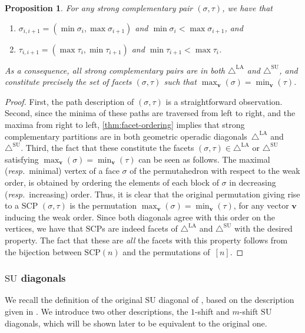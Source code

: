 \documentclass{amsart}
\newtheorem{proposition}[theorem]{Proposition}
\theoremstyle{definition}
\renewcommand{\b}[1]{{\boldsymbol{#1}}} %
\newcommand{\resp}{\textit{resp.}~} %
\renewcommand{\b}[1]{\boldsymbol{#1}} %
\newcommand{\SU}{\mathrm{SU}}
\newcommand{\SUD}{\triangle^{\mathrm{SU}}}
\newcommand{\LAD}{\triangle^{\mathrm{LA}}}
\newcommand{\SCP}{\mathrm{SCP}}
\begin{document}
\begin{proposition} 
\label{lem:SCP-path-desc}
For any strong complementary pair $(\sigma,\tau)$, we have that
\begin{enumerate}
	\item $ \sigma_{i,i+1} = ( \min \sigma_i, \max \sigma_{i+1} )$ and $\min \sigma_i< \max \sigma_{i+1}$, and
	\item $  \tau_{i,i+1} =  ( \max \tau_i, \min \tau_{i+1} )$ and $\min \tau_{i+1}< \max \tau_{i}$.
\end{enumerate}
As a consequence, all strong complementary pairs are in both $\LAD$ and $\SUD$, and constitute precisely the set of facets $(\sigma,\tau)$ such that $\max_{\b{v}}(\sigma) = \min_{\b{v}}(\tau)$.
\end{proposition}
\begin{proof}
First, the path description of $(\sigma,\tau)$ is a straightforward observation. 
Second, since the minima of these paths are traversed from left to right, and the maxima from right to left, \cref{thm:facet-ordering} implies that strong complementary partitions are in both geometric operadic diagonals~$\LAD$ and~$\SUD$.
Third, the fact that these constitute the facets $(\sigma,\tau) \in \LAD$ or $\SUD$ satisfying $\max_{\b{v}}(\sigma) = \min_{\b{v}}(\tau)$ can be seen as follows.
The maximal (\resp minimal) vertex of a face $\sigma$ of the permutahedron with respect to the weak order, is obtained by ordering the elements of each block of $\sigma$ in decreasing (\resp increasing) order. 
Thus, it is clear that the original permutation giving rise to a $\SCP$ $(\sigma,\tau)$ is the permutation $\max_{\b{v}}(\sigma)=\min_{\b{v}}(\tau)$, for any vector $\b{v}$ inducing the weak order.
Since both diagonals agree with this order on the vertices, we have that $\SCP$s are indeed facets of $\LAD$ and $\SUD$ with the desired property. 
The fact that these are \emph{all} the facets with this property follows from the bijection between $\SCP(n)$ and the permutations of~$[n]$.
\end{proof}



\subsubsection{$\SU$ diagonals}

We recall the definition of the original $\SU$ diagonal of \cite{SaneblidzeUmble}, based on the description given in \cite{SaneblidzeUmble-comparingDiagonals}.
We introduce two other descriptions, the $1$-shift and $m$-shift $\SU$ diagonals, which will be shown later to be equivalent to the original one.
\end{document}
